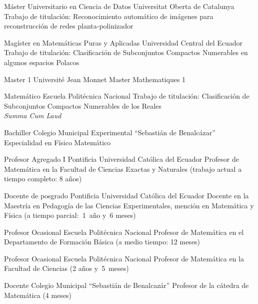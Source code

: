 \documentclass[
    a4paper,
    maincolor=cvblue!70!blue,
    sidecolor=gray!30,
    sectioncolor=cvblue!70!blue,
    sidebarwidth=7.5cm,
    topbottommargin=20pt,
    leftrightmargin=20pt,
]{fortysecondscv}
\begin{document}
\makefrontsidebar

    {Máster Universitario en Ciencia de Datos}
    {Universitat Oberta de Catalunya}
    {\hspace{0pt}\\[-1mm] Trabajo de titulación: Reconocimiento automático de imágenes para reconstrucción de redes planta-polinizador\\[-1.5mm]}

    {Magíster en Matemáticas Puras y Aplicadas}
    {Universidad Central del Ecuador}
    {\hspace{0pt}\\[-1mm] Trabajo de titulación: Clasificación de Subconjuntos Compactos Numerables en algunos espacios Polacos}

    {Master 1}
    {Université Jean Monnet}
    {Master Mathematiques 1}
    
    {Matemático}
    {Escuela Politécnica Nacional}
    {Trabajo de titulación: Clasificación de Subconjuntos Compactos Numerables de los Reales\\ \textit{Summa Cum Laud}}
    
    {Bachiller}
    {Colegio Municipal Experimental ``Sebastián de Benalcázar''}
    {Especialidad en Físico Matemático}

    {Profesor Agregado I}
    {Pontificia Universidad Católica del Ecuador}
    {Profesor de Matemática en la Facultad de Ciencias Exactas y Naturales (trabajo actual a tiempo completo: 8 años)}
    
    {Docente de posgrado}
    {Pontificia Universidad Católica del Ecuador}
    {Docente en la Maestría en Pedagogía de las Ciencias Experimentales, mención en Matemática y Física (a tiempo parcial:~1~año y~6 meses)}

    {Profesor Ocasional}
    {Escuela Politécnica Nacional}
    {Profesor de Matemática en el Departamento de Formación Básica (a medio tiempo: 12 meses)}

    {Profesor Ocasional}
    {Escuela Politécnica Nacional}
    {Profesor de Matemática en la Facultad de Ciencias (2 años y~5~meses)}

    {Docente}
    {Colegio Municipal ``Sebastián de Benalcazár''}
    {Profesor de la cátedra de Matemática (4 meses)}
\end{document}
